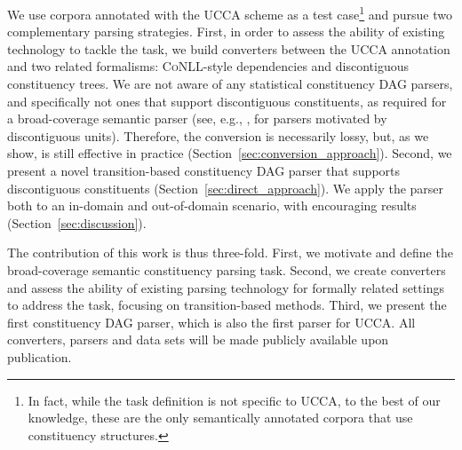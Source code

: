 \documentclass[11pt]{article}
\newcommand{\secref}[1]{Section~\ref{#1}}
\begin{document}
We use corpora annotated with the UCCA scheme \cite{abend2013universal} as a test
case\footnote{In fact, while the task definition is not specific to UCCA,
  to the best of our knowledge, these are the only
  semantically annotated corpora that use constituency structures.}
and pursue two complementary parsing strategies.
First, in order to assess the ability of existing technology to tackle the task,
we build converters between the UCCA annotation and two related formalisms:
\textsc{CoNLL}-style dependencies and discontiguous constituency trees.
We are not aware of any statistical constituency DAG parsers, and specifically not
ones that support discontiguous constituents, as required for a broad-coverage semantic
parser (see, e.g., \cite{pitler2015linear,maier2015discontinuous}, for parsers motivated by discontiguous units). Therefore, the conversion is necessarily lossy, but, as we show, is still effective
in practice (\secref{sec:conversion_approach}).
Second, we present a novel transition-based
constituency DAG parser that supports discontiguous constituents (\secref{sec:direct_approach}). 
We apply the parser both to an in-domain and out-of-domain
scenario, with encouraging results (\secref{sec:discussion}).


The contribution of this work is thus three-fold.
First, we motivate and define the broad-coverage semantic constituency parsing task.
Second, we create converters and assess the ability of existing parsing technology
for formally related settings to address the task, focusing on transition-based methods.
Third, we present the first constituency DAG parser, which is also the
first parser for UCCA. 
All converters, parsers and data sets will be made publicly available upon publication.
\end{document}
